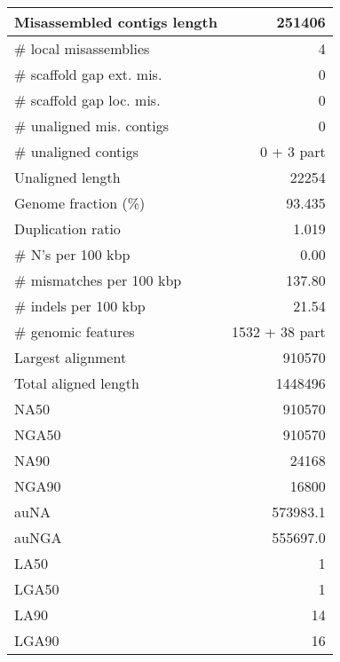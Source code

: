 \documentclass[12pt,a4paper]{article}
\begin{document}
\begin{table}[ht]
\begin{center}
\begin{tabular}{|l*{1}{|r}|}
Misassembled contigs length & 251406 \\ \hline
\# local misassemblies & 4 \\ \hline
\# scaffold gap ext. mis. & 0 \\ \hline
\# scaffold gap loc. mis. & 0 \\ \hline
\# unaligned mis. contigs & 0 \\ \hline
\# unaligned contigs & 0 + 3 part \\ \hline
Unaligned length & 22254 \\ \hline
Genome fraction (\%) & 93.435 \\ \hline
Duplication ratio & 1.019 \\ \hline
\# N's per 100 kbp & 0.00 \\ \hline
\# mismatches per 100 kbp & 137.80 \\ \hline
\# indels per 100 kbp & 21.54 \\ \hline
\# genomic features & 1532 + 38 part \\ \hline
Largest alignment & 910570 \\ \hline
Total aligned length & 1448496 \\ \hline
NA50 & 910570 \\ \hline
NGA50 & 910570 \\ \hline
NA90 & 24168 \\ \hline
NGA90 & 16800 \\ \hline
auNA & 573983.1 \\ \hline
auNGA & 555697.0 \\ \hline
LA50 & 1 \\ \hline
LGA50 & 1 \\ \hline
LA90 & 14 \\ \hline
LGA90 & 16 \\ \hline
\end{tabular}
\end{center}
\end{table}
\end{document}

